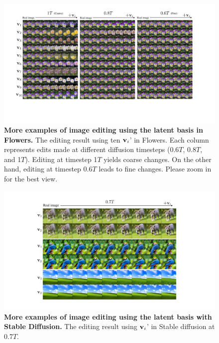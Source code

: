 \begin{figure}[!h]
    \centering
    \includegraphics[width=1.0\linewidth]{figure/flowers_vis.pdf}
    \caption{
    \textbf{More examples of image editing using the latent basis in Flowers.} The editing result using ten $\mathbf{v}_i$' in Flowers.  Each column represents edits made at different diffusion timesteps (0.6$T$, 0.8$T$, and 1$T$). Editing at timestep 1$T$ yields coarse changes. On the other hand, editing at timestep 0.6$T$ leads to fine changes. Please zoom in for the best view.}
    \label{fig:flowers_vis}
\end{figure}

\begin{figure}[!h]
    \centering
    \includegraphics[width=1.0\linewidth]{figure/stable_7T.pdf}
    \caption{
    \textbf{More examples of image editing using the latent basis with Stable Diffusion.} The editing result using $\mathbf{v}_i$' in Stable diffusion at 0.7$T$.}
    \label{fig:stable_7T}
\end{figure}

\clearpage

